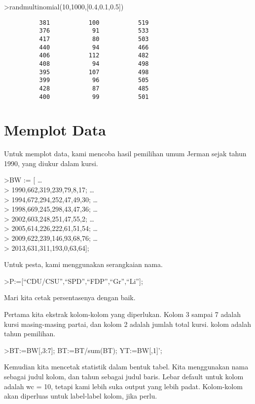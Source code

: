 \documentclass[
]{book}
\begin{document}
\textgreater randmultinomial(10,1000,{[}0.4,0.1,0.5{]})

\begin{verbatim}
          381           100           519 
          376            91           533 
          417            80           503 
          440            94           466 
          406           112           482 
          408            94           498 
          395           107           498 
          399            96           505 
          428            87           485 
          400            99           501 
\end{verbatim}

\chapter{Memplot Data}\label{memplot-data}

Untuk memplot data, kami mencoba hasil pemilihan umum Jerman sejak tahun 1990, yang diukur dalam kursi.

\textgreater BW := {[} \ldots{}\\
\textgreater{} 1990,662,319,239,79,8,17; \ldots{}\\
\textgreater{} 1994,672,294,252,47,49,30; \ldots{}\\
\textgreater{} 1998,669,245,298,43,47,36; \ldots{}\\
\textgreater{} 2002,603,248,251,47,55,2; \ldots{}\\
\textgreater{} 2005,614,226,222,61,51,54; \ldots{}\\
\textgreater{} 2009,622,239,146,93,68,76; \ldots{}\\
\textgreater{} 2013,631,311,193,0,63,64{]};

Untuk pesta, kami menggunakan serangkaian nama.

\textgreater P:={[}``CDU/CSU'',``SPD'',``FDP'',``Gr'',``Li''{]};

Mari kita cetak persentasenya dengan baik.

Pertama kita ekstrak kolom-kolom yang diperlukan. Kolom 3 sampai 7 adalah kursi masing-masing partai, dan kolom 2 adalah jumlah total kursi. kolom adalah tahun pemilihan.

\textgreater BT:=BW{[},3:7{]}; BT:=BT/sum(BT); YT:=BW{[},1{]}';

Kemudian kita mencetak statistik dalam bentuk tabel. Kita menggunakan nama sebagai judul kolom, dan tahun sebagai judul baris. Lebar default untuk kolom adalah wc = 10, tetapi kami lebih suka output yang lebih padat. Kolom-kolom akan diperluas untuk label-label kolom, jika perlu.
\end{document}
